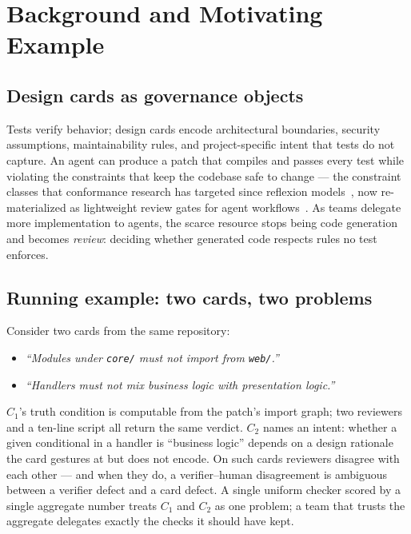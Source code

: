 \documentclass[conference]{IEEEtran}
\begin{document}
\section{Background and Motivating Example}\label{sec:background}

\subsection{Design cards as governance objects}
Tests verify behavior; design cards encode architectural boundaries, security
assumptions, maintainability rules, and project-specific intent that tests do
not capture. An agent can produce a patch that compiles and passes every test
while violating the constraints that keep the codebase safe to change ---
the constraint classes that conformance research has targeted since reflexion
models~\cite{murphy1995reflexion,knodel2007comparison,passos2010static}, now
re-materialized as lightweight review gates for agent
workflows~\cite{sadowski2018lessons,tufano2021towards}. As teams delegate more
implementation to agents, the scarce resource stops being code generation and
becomes \emph{review}: deciding whether generated code respects rules no test
enforces.

\subsection{Running example: two cards, two problems}\label{sec:background:example}
Consider two cards from the same repository:
\begin{itemize}[leftmargin=1.2em]
  \item[$C_1$:] \emph{``Modules under \texttt{core/} must not import from
  \texttt{web/}.''}
  \item[$C_2$:] \emph{``Handlers must not mix business logic with presentation
  logic.''}
\end{itemize}
$C_1$'s truth condition is computable from the patch's import graph; two
reviewers and a ten-line script all return the same verdict. $C_2$ names an
intent: whether a given conditional in a handler is ``business logic'' depends
on a design rationale the card gestures at but does not encode. On such cards
reviewers disagree with each other --- and when they do, a verifier--human
disagreement is ambiguous between a verifier defect and a card defect. A single
uniform checker scored by a single aggregate number treats $C_1$ and $C_2$ as
one problem; a team that trusts the aggregate delegates exactly the checks it
should have kept.
\end{document}
